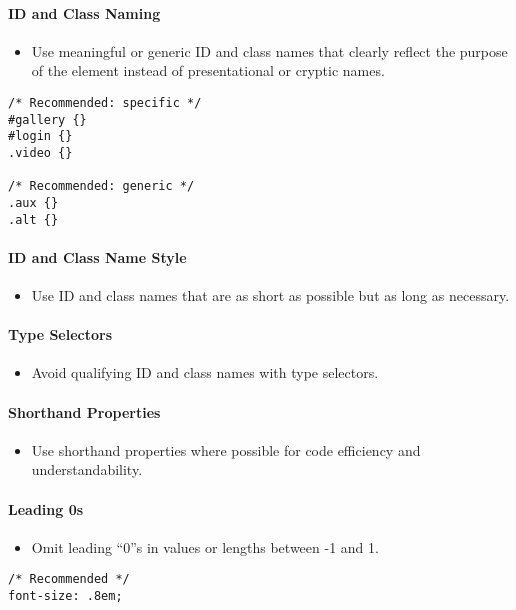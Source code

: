 \documentclass[a4paper, 11pt]{article}
\begin{document}
\paragraph{ID and Class Naming}
\begin{itemize}
\item Use meaningful or generic ID and class names that clearly reflect the purpose of the element instead of presentational or cryptic names.
\end{itemize}
\begin{verbatim}
/* Recommended: specific */
#gallery {}
#login {}
.video {}

/* Recommended: generic */
.aux {}
.alt {}
\end{verbatim}

\paragraph{ID and Class Name Style}
\begin{itemize}
\item Use ID and class names that are as short as possible but as long as necessary.
\end{itemize}

\paragraph{Type Selectors}
\begin{itemize}
\item Avoid qualifying ID and class names with type selectors.
\end{itemize}

\paragraph{Shorthand Properties}
\begin{itemize}
\item Use shorthand properties where possible for code efficiency and understandability.
\end{itemize}

\paragraph{Leading 0s}
\begin{itemize}
\item Omit leading “0”s in values or lengths between -1 and 1.
\end{itemize}
\begin{verbatim}
/* Recommended */
font-size: .8em;
\end{verbatim}
\end{document}
